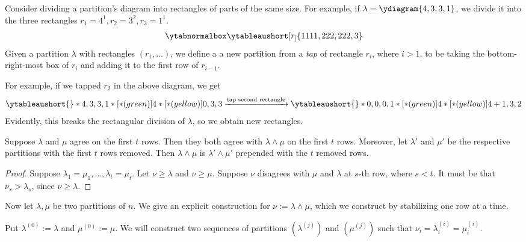 \documentclass{article}
\begin{document}
Consider dividing a partition's diagram into rectangles of parts of the same size. For example, if $\lambda = \ydiagram{4,3,3,1}$, we divide it into the three rectangles $r_1 = 4^1, r_2 = 3^2, r_3 = 1^1$.
\[
    \ytabnormalbox
    \ytableaushort[r_]{1111,222,222,3}
\]
Given a partition $\lambda$ with rectangles $(r_1, \ldots)$, we define a a new partition from a \textit{tap} of rectangle $r_i$, where $i > 1$, to be taking the bottom-right-most box of $r_i$ and adding it to the first row of $r_{i-1}$.

For example, if we tapped $r_2$ in the above diagram, we get
\[
    \ytableaushort{}*{4,3,3,1}*[*(green)]{4}*[*(yellow)]{0,3,3}
    \xrightarrow{\text{tap second rectangle}} 
    \ytableaushort{}*{0,0,0,1}*[*(green)]{4}*[*(yellow)]{4+1,3,2}
\]
Evidently, this breaks the rectangular division of $\lambda$, so we obtain new rectangles.

\begin{lemma}
    Suppose $\lambda$ and $\mu$ agree on the first $t$ rows. Then they both agree with $\lambda \wedge \mu$ on the first $t$ rows. Moreover, let $\lambda'$ and $\mu'$ be the respective partitions with the first $t$ rows removed. Then $\lambda \wedge \mu$ is $\lambda' \wedge \mu'$ prepended with the $t$ removed rows.
\end{lemma}
\begin{proof}
    Suppose $\lambda_1 = \mu_1, \ldots, \lambda_t = \mu_t$.
    Let $\nu \geq \lambda$ and $\nu \geq \mu$.
    Suppose $\nu$ disagrees with $\mu$ and $\lambda$ at $s$-th row, where $s < t$.
    It must be that $\nu_s > \lambda_s$, since $\nu \geq \lambda$. 
\end{proof}

Now let $\lambda, \mu$ be two partitions of $n$. 
We give an explicit construction for $\nu := \lambda \wedge \mu$, which we construct by stabilizing one row at a time.

Put $\lambda^{(0)} := \lambda$ and $\mu^{(0)} := \mu$. We will construct two sequences of partitions $(\lambda^{(j)})$ and $(\mu^{(j)})$ such that $\nu_i = \lambda^{(i)}_i = \mu^{(i)}_i$.
\end{document}
